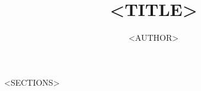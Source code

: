 \documentclass[11pt]{article} %
\title{<TITLE>}
\author{<AUTHOR>}
\begin{document}
\maketitle
<SECTIONS>
\end{document}
